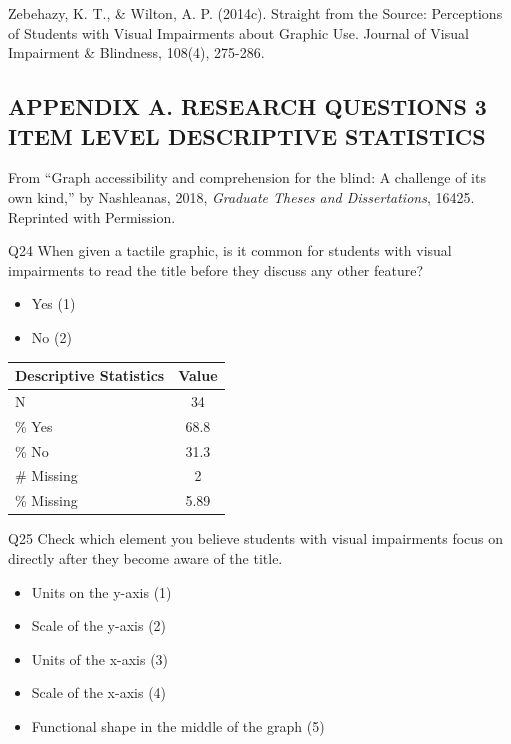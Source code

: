 \documentclass[11.5pt]{sig-alternate} %
\begin{document}
Zebehazy, K. T., \& Wilton, A. P. (2014c). Straight from the Source: Perceptions of Students with Visual Impairments about Graphic Use. Journal of Visual Impairment \& Blindness, 108(4), 275-286.
\clearpage
\begin{large}
\leftskip 0in
\parindent 0in 

\section*{APPENDIX A. RESEARCH QUESTIONS 3 ITEM LEVEL DESCRIPTIVE STATISTICS}
From “Graph accessibility and comprehension for the blind: A challenge of its own kind,” by Nashleanas, 2018, \textit{Graduate Theses and Dissertations}, 16425. Reprinted with Permission.

Q24 When given a tactile graphic, is it common for students with visual impairments to read the title before they discuss any other feature?
\begin{itemize} \label{white}
    \item Yes (1)
    \item No (2)
\end{itemize}

\begin{table}[h]
\centering
\begin{tabular}{lc}
Descriptive Statistics & Value\\ \hline
N & 34 \\
\% Yes & 68.8\\
\% No & 31.3\\
\# Missing & 2\\
\% Missing & 5.89\\
\end{tabular}
\end{table}

Q25 Check which element you believe students with visual impairments focus on directly after they become aware of the title.
\begin{itemize}
    \item Units on the y-axis (1)
    \item Scale of the y-axis (2)
    \item Units of the x-axis (3)
    \item Scale of the x-axis (4)
    \item Functional shape in the middle of the graph (5)
\end{itemize}


\end{large}
\end{document}
